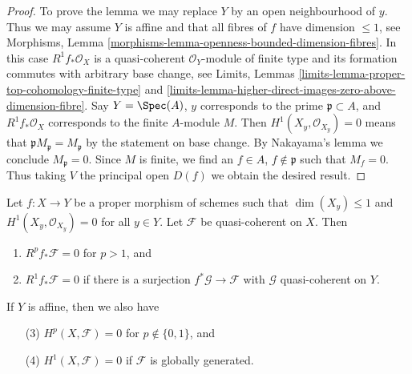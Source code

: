 \begin{proof}
To prove the lemma we may replace $Y$ by an open neighbourhood of $y$.
Thus we may assume $Y$ is affine and that all fibres of $f$ have
dimension $\leq 1$, see
Morphisms, Lemma \ref{morphisms-lemma-openness-bounded-dimension-fibres}.
In this case $R^1f_*\mathcal{O}_X$ is a quasi-coherent $\mathcal{O}_Y$-module
of finite type and its formation commutes with arbitrary base change, see
Limits, Lemmas \ref{limits-lemma-proper-top-cohomology-finite-type} and
\ref{limits-lemma-higher-direct-images-zero-above-dimension-fibre}.
Say $Y = \Spec(A)$, $y$ corresponds to the prime $\mathfrak p \subset A$, and
$R^1f_*\mathcal{O}_X$ corresponds to the finite $A$-module $M$.
Then $H^1(X_y, \mathcal{O}_{X_y}) = 0$ means that
$\mathfrak pM_\mathfrak p = M_\mathfrak p$ by the statement
on base change. By Nakayama's lemma
we conclude $M_\mathfrak p = 0$. Since $M$ is finite, we find
an $f \in A$, $f \not \in \mathfrak p$ such that $M_f = 0$.
Thus taking $V$ the principal open $D(f)$ we obtain the desired result.
\end{proof}

\begin{lemma}
\label{lemma-globally-generated-vanishing}
Let $f : X \to Y$ be a proper morphism of schemes such
that $\dim(X_y) \leq 1$ and $H^1(X_y, \mathcal{O}_{X_y}) = 0$
for all $y \in Y$. Let $\mathcal{F}$ be quasi-coherent on $X$. Then
\begin{enumerate}
\item $R^pf_*\mathcal{F} = 0$ for $p > 1$, and
\item $R^1f_*\mathcal{F} = 0$ if there is a surjection
$f^*\mathcal{G} \to \mathcal{F}$ with $\mathcal{G}$ quasi-coherent
on $Y$.
\end{enumerate}
If $Y$ is affine, then we also have
\begin{enumerate}
\item[(3)] $H^p(X, \mathcal{F}) = 0$ for $p \not \in \{0, 1\}$, and
\item[(4)] $H^1(X, \mathcal{F}) = 0$ if $\mathcal{F}$ is globally generated.
\end{enumerate}
\end{lemma}

